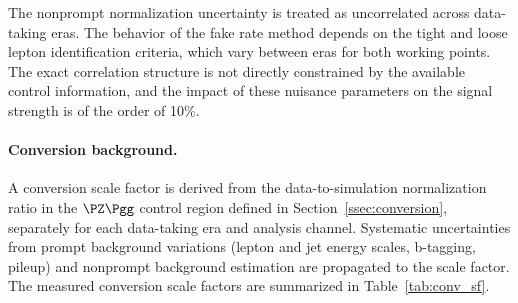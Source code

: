 The nonprompt normalization uncertainty is treated as uncorrelated across data-taking eras. The behavior of the fake rate method depends on the tight and loose lepton identification criteria, which vary between eras for both working points. The exact correlation structure is not directly constrained by the available control information, and the impact of these nuisance parameters on the signal strength is of the order of 10\%.

\paragraph{Conversion background.}
A conversion scale factor is derived from the data-to-simulation normalization ratio in the $\PZ\Pgg$ control region defined in Section~\ref{ssec:conversion}, separately for each data-taking era and analysis channel. Systematic uncertainties from prompt background variations (lepton and jet energy scales, b-tagging, pileup) and nonprompt background estimation are propagated to the scale factor. The measured conversion scale factors are summarized in Table~\ref{tab:conv_sf}.

